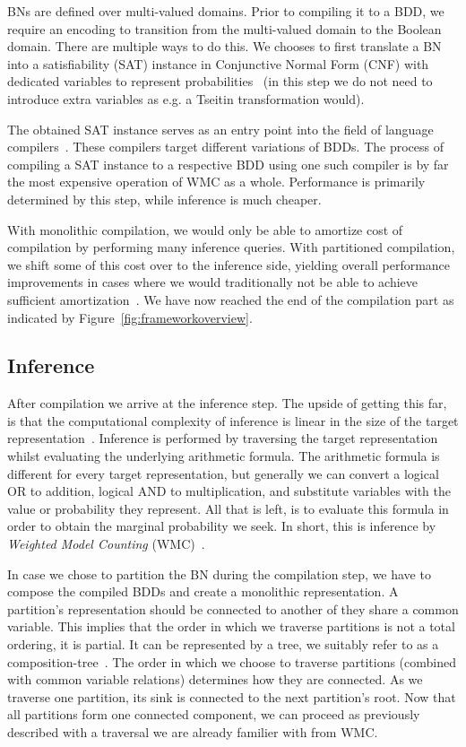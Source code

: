BNs are defined over multi-valued domains. Prior to compiling it to a BDD, we require an encoding to transition from the multi-valued domain to the Boolean domain. There are multiple ways to do this. We chooses to first translate a BN into a satisfiability (SAT) instance in Conjunctive Normal Form (CNF) with dedicated variables to represent probabilities~\cite{chavira2008probabilistic,dal2017wpbdd} (in this step we do not need to introduce extra variables as e.g. a Tseitin transformation would).

The obtained SAT instance serves as an entry point into the field of language compilers~\cite{dudek2020addmc}. These compilers target different variations of BDDs. The process of compiling a SAT instance to a respective BDD using one such compiler is by far the most expensive operation of WMC as a whole. Performance is primarily determined by this step, while inference is much cheaper.

With monolithic compilation, we would only be able to amortize cost of compilation by performing many inference queries. With partitioned compilation, we shift some of this cost over to the inference side, yielding overall performance improvements in cases where we would traditionally not be able to achieve sufficient amortization~\cite{dal2017reducing}. We have now reached the end of the compilation part as indicated by Figure~\ref{fig:frameworkoverview}.

\subsection{Inference}\label{subsec:inference}

After compilation we arrive at the inference step. The upside of getting this far, is that the computational complexity of inference is linear in the size of the target representation~\cite{darwiche2002knowledge}. Inference is performed by traversing the target representation whilst evaluating the underlying arithmetic formula. The arithmetic formula is different for every target representation, but generally we can convert a logical OR to addition, logical AND to multiplication, and substitute variables with the value or probability they represent. All that is left, is to evaluate this formula in order to obtain the marginal probability we seek. In short, this is inference by \emph{Weighted Model Counting} (WMC)~\cite{chavira2008probabilistic}.

In case we chose to partition the BN during the compilation step, we have to compose the compiled BDDs and create a monolithic representation. A partition's representation should be connected to another of they share a common variable. This implies that the order in which we traverse partitions is not a total ordering, it is partial. It can be represented by a tree, we suitably refer to as a composition-tree~\cite{dal2021compositional}. The order in which we choose to traverse partitions (combined with common variable relations) determines how they are connected. As we traverse one partition, its sink is connected to the next partition's root. Now that all partitions form one connected component, we can proceed as previously described with a traversal we are already familier with from WMC.

